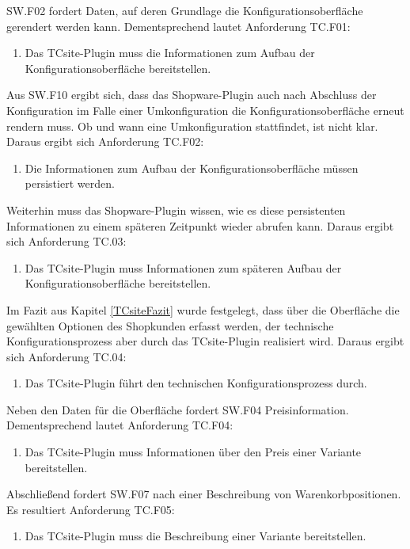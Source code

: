 \documentclass[11pt, a4paper, titlepage, listof=totoc, bibliography=totoc, index=totoc, twoside, openright, headings=normal, draft]{scrreprt}
\begin{document}
SW.F02 fordert Daten, auf deren Grundlage die Konfigurationsoberfläche gerendert werden kann. Dementsprechend lautet Anforderung TC.F01:
\begin{enumerate}[TC.F01:]\bfseries
\item Das TCsite-Plugin muss die Informationen zum Aufbau der Konfigurationsoberfläche bereitstellen.
\end{enumerate}
Aus SW.F10 ergibt sich, dass das Shopware-Plugin auch nach Abschluss der Konfiguration im Falle einer Umkonfiguration die Konfigurationsoberfläche erneut rendern muss. Ob und wann eine Umkonfiguration stattfindet, ist nicht klar. Daraus ergibt sich Anforderung TC.F02:
\begin{enumerate}[TC.F02:]\bfseries
\item Die Informationen zum Aufbau der Konfigurationsoberfläche müssen persistiert werden.
\end{enumerate}
Weiterhin muss das Shopware-Plugin wissen, wie es diese persistenten Informationen zu einem späteren Zeitpunkt wieder abrufen kann. Daraus ergibt sich Anforderung TC.03:
\begin{enumerate}[TC.F03:]\bfseries
\item Das TCsite-Plugin muss Informationen zum späteren Aufbau der Konfigurationsoberfläche bereitstellen.
\end{enumerate}
Im Fazit aus Kapitel \ref{TCsiteFazit} wurde festgelegt, dass über die Oberfläche die gewählten Optionen des Shopkunden erfasst werden, der technische Konfigurationsprozess aber durch das TCsite-Plugin realisiert wird. Daraus ergibt sich Anforderung TC.04:
\begin{enumerate}[TC.F04:]\bfseries
\item Das TCsite-Plugin führt den technischen Konfigurationsprozess durch.
\end{enumerate}
Neben den Daten für die Oberfläche fordert SW.F04 Preisinformation. Dementsprechend lautet Anforderung TC.F04:
\begin{enumerate}[TC.F04:]\bfseries
\item Das TCsite-Plugin muss Informationen über den Preis einer Variante bereitstellen.
\end{enumerate}
Abschließend fordert SW.F07 nach einer Beschreibung von Warenkorbpositionen. Es resultiert Anforderung TC.F05:
\begin{enumerate}[TC.F05:]\bfseries
\item Das TCsite-Plugin muss die Beschreibung einer Variante bereitstellen.
\end{enumerate}
\end{document}
